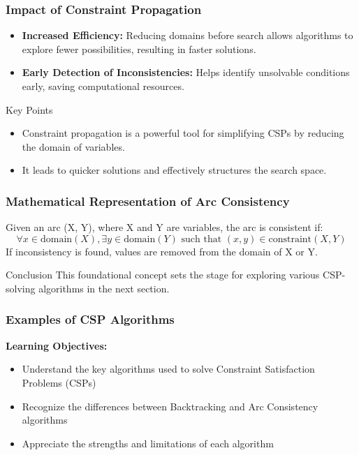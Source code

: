\documentclass[aspectratio=169]{beamer}
\begin{document}
\begin{frame}[fragile]
    \frametitle{Impact of Constraint Propagation}
    \begin{itemize}
        \item \textbf{Increased Efficiency:} Reducing domains before search allows algorithms to explore fewer possibilities, resulting in faster solutions.
        \item \textbf{Early Detection of Inconsistencies:} Helps identify unsolvable conditions early, saving computational resources.
    \end{itemize}
    
    \begin{block}{Key Points}
        \begin{itemize}
            \item Constraint propagation is a powerful tool for simplifying CSPs by reducing the domain of variables.
            \item It leads to quicker solutions and effectively structures the search space.
        \end{itemize}
    \end{block}
\end{frame}

\begin{frame}[fragile]
    \frametitle{Mathematical Representation of Arc Consistency}
    Given an arc (X, Y), where X and Y are variables, the arc is consistent if:
    \begin{equation}
        \forall x \in \text{domain}(X), \exists y \in \text{domain}(Y) \text{ such that } (x, y) \in \text{constraint}(X, Y)
    \end{equation}
    If inconsistency is found, values are removed from the domain of X or Y.

    \begin{block}{Conclusion}
        This foundational concept sets the stage for exploring various CSP-solving algorithms in the next section.
    \end{block}
\end{frame}

\begin{frame}
    \frametitle{Examples of CSP Algorithms}
    
    \textbf{Learning Objectives:}
    \begin{itemize}
        \item Understand the key algorithms used to solve Constraint Satisfaction Problems (CSPs)
        \item Recognize the differences between Backtracking and Arc Consistency algorithms
        \item Appreciate the strengths and limitations of each algorithm
    \end{itemize}
\end{frame}
\end{document}
